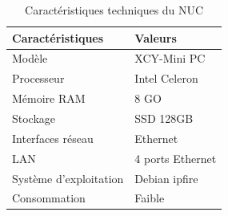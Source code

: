 \documentclass[main.tex]{subfiles}
\begin{document}
\begin{table}[h!]
\centering
\begin{tabular}{|l|l|}
\hline
\textbf{Caractéristiques} & \textbf{Valeurs} \\ \hline
Modèle & XCY-Mini PC \\ \hline
Processeur & Intel Celeron \\ \hline
Mémoire RAM & 8 GO \\ \hline
Stockage & SSD 128GB \\ \hline
Interfaces réseau & Ethernet \\ \hline
LAN & 4 ports Ethernet \\ \hline
Système d'exploitation & Debian ipfire \\ \hline
Consommation & Faible \\ \hline
\end{tabular}
\caption{Caractéristiques techniques du NUC}
\end{table}


\newpage
\end{document}
